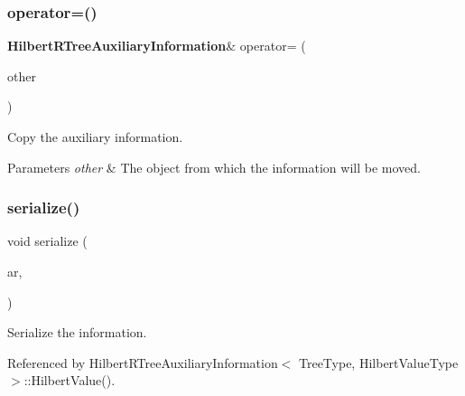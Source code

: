 \subsubsection{operator=()}
{\footnotesize\ttfamily \textbf{ Hilbert\+R\+Tree\+Auxiliary\+Information}\& operator= (\begin{DoxyParamCaption}\item[{const \textbf{ Hilbert\+R\+Tree\+Auxiliary\+Information}$<$ Tree\+Type, Hilbert\+Value\+Type $>$ \&}]{other }\end{DoxyParamCaption})}



Copy the auxiliary information. 


\begin{DoxyParams}{Parameters}
{\em other} & The object from which the information will be moved. \\
\hline
\end{DoxyParams}
\mbox{\label{classmlpack_1_1tree_1_1HilbertRTreeAuxiliaryInformation_a65cba07328997659bec80b9879b15a51}} 
\subsubsection{serialize()}
{\footnotesize\ttfamily void serialize (\begin{DoxyParamCaption}\item[{Archive \&}]{ar,  }\item[{const uint32\+\_\+t}]{ }\end{DoxyParamCaption})}



Serialize the information. 



Referenced by Hilbert\+R\+Tree\+Auxiliary\+Information$<$ Tree\+Type, Hilbert\+Value\+Type $>$\+::\+Hilbert\+Value().

\mbox{\label{classmlpack_1_1tree_1_1HilbertRTreeAuxiliaryInformation_a377d5bde0d85c152100b0e6f22d2cd2f}} 
